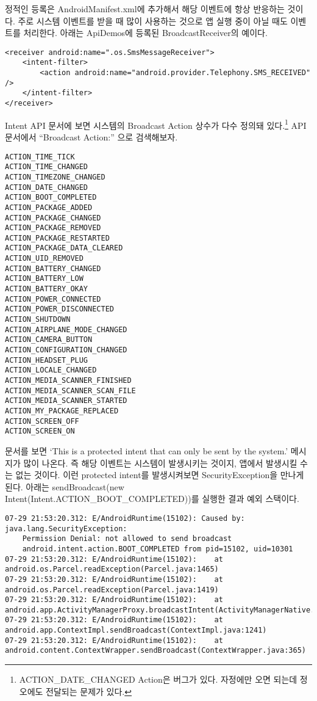정적인 등록은 AndroidManifest.xml에 추가해서 해당 이벤트에 항상 반응하는 것이다. 주로 시스템 이벤트를 받을 때 많이 사용하는 것으로 앱 실행 중이 아닐 때도 이벤트를 처리한다.
아래는 ApiDemos에 등록된 BroadcastReceiver의 예이다.
\begin{lstlisting}[frame=single] 
<receiver android:name=".os.SmsMessageReceiver">
	<intent-filter>
		<action android:name="android.provider.Telephony.SMS_RECEIVED" />
	</intent-filter>
</receiver>
\end{lstlisting}

Intent API 문서에 보면 시스템의 Broadcast Action 상수가 다수 정의돼 있다.\footnote{ACTION\_DATE\_CHANGED Action은 버그가 있다. 자정에만 오면 되는데 정오에도 전달되는 문제가 있다.
} 
API 문서에서 ``Broadcast Action:'' 으로 검색해보자.

\begin{verbatim}
ACTION_TIME_TICK
ACTION_TIME_CHANGED
ACTION_TIMEZONE_CHANGED
ACTION_DATE_CHANGED
ACTION_BOOT_COMPLETED
ACTION_PACKAGE_ADDED
ACTION_PACKAGE_CHANGED
ACTION_PACKAGE_REMOVED
ACTION_PACKAGE_RESTARTED
ACTION_PACKAGE_DATA_CLEARED
ACTION_UID_REMOVED
ACTION_BATTERY_CHANGED
ACTION_BATTERY_LOW
ACTION_BATTERY_OKAY
ACTION_POWER_CONNECTED
ACTION_POWER_DISCONNECTED
ACTION_SHUTDOWN
ACTION_AIRPLANE_MODE_CHANGED
ACTION_CAMERA_BUTTON
ACTION_CONFIGURATION_CHANGED
ACTION_HEADSET_PLUG
ACTION_LOCALE_CHANGED
ACTION_MEDIA_SCANNER_FINISHED
ACTION_MEDIA_SCANNER_SCAN_FILE
ACTION_MEDIA_SCANNER_STARTED
ACTION_MY_PACKAGE_REPLACED
ACTION_SCREEN_OFF
ACTION_SCREEN_ON
\end{verbatim}

문서를 보면 `This is a protected intent that can only be sent by the system.' 메시지가 많이 나온다. 즉 해당 이벤트는 시스템이 발생시키는 것이지, 앱에서 발생시킬 수는 없는 것이다.
이런 protected intent를 발생시켜보면 SecurityException을 만나게 된다. 아래는 
sendBroadcast(new Intent(Intent.ACTION\_BOOT\_COMPL\-ETED))를 실행한 결과 예외 스택이다.
\begin{lstlisting}[frame=single] 
07-29 21:53:20.312: E/AndroidRuntime(15102): Caused by: java.lang.SecurityException:
	Permission Denial: not allowed to send broadcast
	android.intent.action.BOOT_COMPLETED from pid=15102, uid=10301
07-29 21:53:20.312: E/AndroidRuntime(15102): 	at android.os.Parcel.readException(Parcel.java:1465)
07-29 21:53:20.312: E/AndroidRuntime(15102): 	at android.os.Parcel.readException(Parcel.java:1419)
07-29 21:53:20.312: E/AndroidRuntime(15102): 	at android.app.ActivityManagerProxy.broadcastIntent(ActivityManagerNative.java:2430)
07-29 21:53:20.312: E/AndroidRuntime(15102): 	at android.app.ContextImpl.sendBroadcast(ContextImpl.java:1241)
07-29 21:53:20.312: E/AndroidRuntime(15102): 	at android.content.ContextWrapper.sendBroadcast(ContextWrapper.java:365)
\end{lstlisting}

